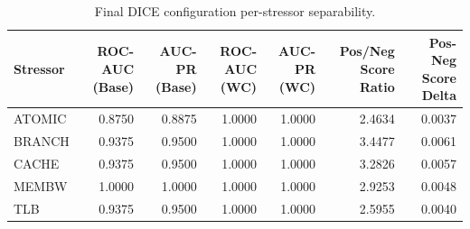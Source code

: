 \begin{table}[t]
\centering
\caption{Final DICE configuration per-stressor separability.}
\label{tab:dice_full_stressor}
\footnotesize
\begin{tabular}{lrrrrrr}
\toprule
Stressor & ROC-AUC (Base) & AUC-PR (Base) & ROC-AUC (WC) & AUC-PR (WC) & Pos/Neg Score Ratio & Pos-Neg Score Delta \\
\midrule
ATOMIC & 0.8750 & 0.8875 & 1.0000 & 1.0000 & 2.4634 & 0.0037 \\
BRANCH & 0.9375 & 0.9500 & 1.0000 & 1.0000 & 3.4477 & 0.0061 \\
CACHE & 0.9375 & 0.9500 & 1.0000 & 1.0000 & 3.2826 & 0.0057 \\
MEMBW & 1.0000 & 1.0000 & 1.0000 & 1.0000 & 2.9253 & 0.0048 \\
TLB & 0.9375 & 0.9500 & 1.0000 & 1.0000 & 2.5955 & 0.0040 \\
\bottomrule
\end{tabular}

\end{table}
